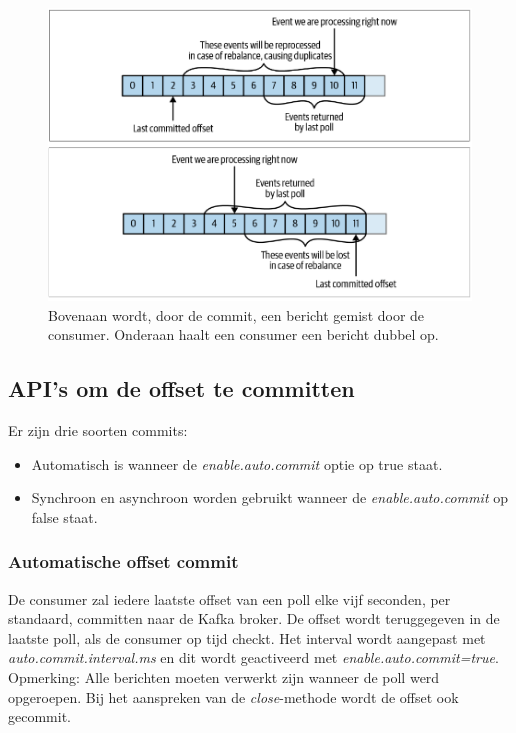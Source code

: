 \documentclass[a4paper,10pt,twoside]{report}
\begin{document}
\begin{figure}
	\includegraphics[width=\linewidth]{images/Screenshot_266.png}
	\caption{Bovenaan wordt, door de commit, een bericht gemist door de consumer. Onderaan haalt een consumer een bericht dubbel op.}
\end{figure}

\subsection{API's om de offset te committen}

Er zijn drie soorten commits:

\begin{itemize}
	\item Automatisch is wanneer de \textit{enable.auto.commit} optie op true staat.
	\item Synchroon en asynchroon worden gebruikt wanneer de \textit{enable.auto.commit} op false staat.
\end{itemize}

\subsubsection{Automatische offset commit}

De consumer zal iedere laatste offset van een poll elke vijf seconden, per standaard, committen naar de Kafka broker. De offset wordt teruggegeven in de laatste poll, als de consumer op tijd checkt. Het interval wordt aangepast met \textit{auto.commit.interval.ms} en dit wordt geactiveerd met \textit{enable.auto.commit=true}. Opmerking: Alle berichten moeten verwerkt zijn wanneer de poll werd opgeroepen. Bij het aanspreken van de \textit{close}-methode wordt de offset ook gecommit.
\end{document}
